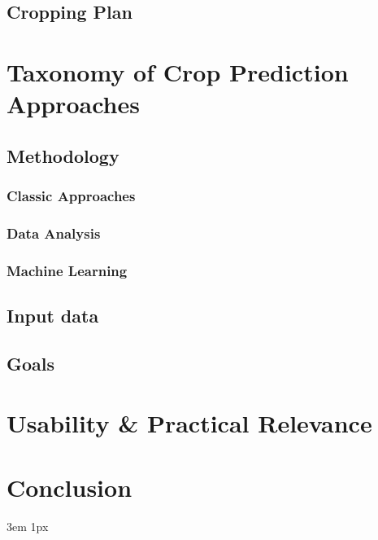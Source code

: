 \documentclass{Academic}
\begin{document}
    \subsection{Cropping Plan}
    

    \section{Taxonomy of Crop Prediction Approaches}

    \subsection{Methodology}

    \subsubsection{Classic Approaches}

    \subsubsection{Data Analysis}

    \subsubsection{Machine Learning}

    \subsection{Input data}

    \subsection{Goals}


    \section{Usability \& Practical Relevance}


    \section{Conclusion}

    \singlespacing
    \emergencystretch 3em
    \hfuzz 1px
    \printbibliography[heading=bibnumbered]




\end{document}
